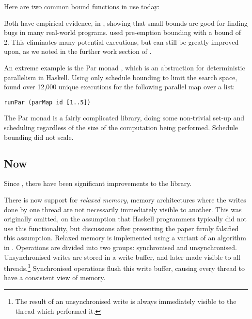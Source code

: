 Here are two common bound functions in use today:



Both have empirical evidence, in \citep{empirical}, showing that small
bounds are good for finding bugs in many real-world
programs. \dejafu{} used pre-emption bounding with a bound of 2. This
eliminates many potential executions, but can still be greatly
improved upon, as we noted in the further work section of
\citep{dejafu}.

An extreme example is the Par monad \citep{parmonad}, which is an
abstraction for deterministic parallelism in Haskell. Using only
schedule bounding to limit the search space, \dejafu{} found over
12,000 unique executions for the following parallel map over a list:

\begin{verbatim}
runPar (parMap id [1..5])
\end{verbatim}

The Par monad is a fairly complicated library, doing some non-trivial
set-up and scheduling regardless of the size of the computation being
performed. Schedule bounding did not scale.

\subsection{\dejafu{} Now}
\label{sec:progress-dejafu-now}

Since \citep{dejafu}, there have been significant improvements to the
library.

There is now support for \emph{relaxed memory}, memory architectures
where the writes done by one thread are not necessarily immediately
visible to another. This was originally omitted, on the assumption
that Haskell programmers typically did not use this functionality, but
discussions after presenting the paper firmly falsified this
assumption. Relaxed memory is implemented using a variant of an
algorithm in \citep{rdpor}. Operations are divided into two groups:
synchronised and unsynchronised. Unsynchronised writes are stored in a
write buffer, and later made visible to all threads.\footnote{The
  result of an unsynchronised write is always immediately visible to
  the thread which performed it.} Synchronised operations flush this
write buffer, causing every thread to have a consistent view of
memory.

